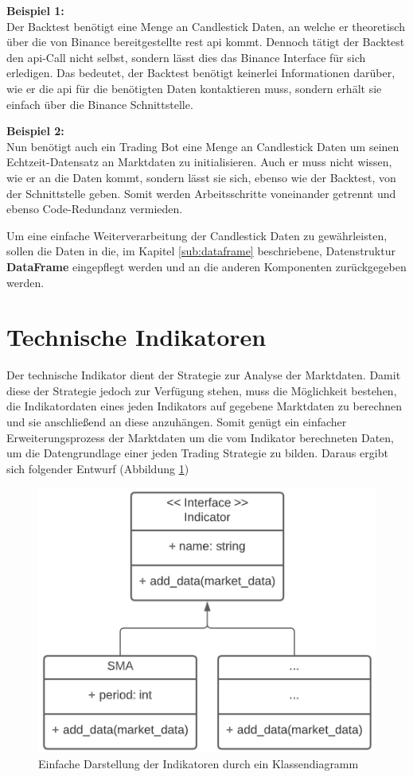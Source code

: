\documentclass[oneside]{ausarbeitung}
\begin{document}
\textbf{Beispiel 1:} \\
Der Backtest benötigt eine Menge an Candlestick Daten, an welche er theoretisch über die von Binance bereitgestellte \ac{rest} \ac{api} kommt. Dennoch tätigt der Backtest den \ac{api}-Call nicht selbst, sondern lässt dies das Binance Interface für sich erledigen. Das bedeutet, der Backtest benötigt keinerlei Informationen darüber, wie er die \ac{api} für die benötigten Daten kontaktieren muss, sondern erhält sie einfach über die Binance Schnittstelle.

\textbf{Beispiel 2:} \\
Nun benötigt auch ein Trading Bot eine Menge an Candlestick Daten um seinen Echtzeit-Datensatz an Marktdaten zu initialisieren. Auch er muss nicht wissen, wie er an die Daten kommt, sondern lässt sie sich, ebenso wie der Backtest, von der Schnittstelle geben. Somit werden Arbeitsschritte voneinander getrennt und ebenso Code-Redundanz vermieden.

Um eine einfache Weiterverarbeitung der Candlestick Daten zu gewährleisten, sollen die Daten in die, im Kapitel \ref{sub:dataframe} beschriebene, Datenstruktur \textbf{DataFrame} eingepflegt werden und an die anderen Komponenten zurückgegeben werden.


\section{Technische Indikatoren}
\label{sec:technische_Indikatoren}

Der technische Indikator dient der Strategie zur Analyse der Marktdaten. Damit diese der Strategie jedoch zur Verfügung stehen, muss die Möglichkeit bestehen, die Indikatordaten eines jeden Indikators auf gegebene Marktdaten zu berechnen und sie anschließend an diese anzuhängen. Somit genügt ein einfacher Erweiterungsprozess der Marktdaten um die vom Indikator berechneten Daten, um die Datengrundlage einer jeden Trading Strategie zu bilden. Daraus ergibt sich folgender Entwurf (Abbildung \ref{fig:10})

\begin{figure}[H]
  \centering
  \includegraphics[height=0.34\textheight]{uml/indicators_uml.png}
  \caption{Einfache Darstellung der Indikatoren durch ein Klassendiagramm}
  \label{fig:10}
\end{figure}
\end{document}
